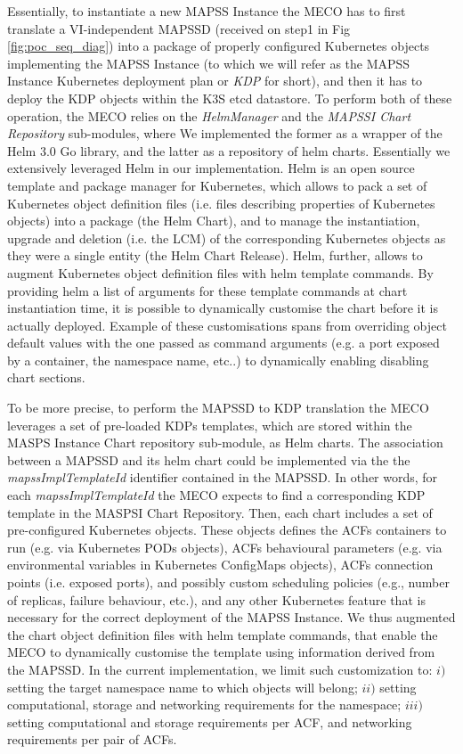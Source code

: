 Essentially, to instantiate a new MAPSS Instance the MECO has to first translate a VI-independent MAPSSD (received on step1 in Fig \ref{fig:poc_seq_diag}) into a package of properly configured Kubernetes objects implementing the MAPSS Instance (to which we will refer as the MAPSS Instance Kubernetes deployment plan or \textit{KDP} for short), and then it has to deploy the KDP objects within the K3S etcd datastore. To perform both of these operation, the MECO relies on the \textit{HelmManager} and the \textit{MAPSSI Chart Repository} sub-modules, where We implemented the former as a wrapper of the Helm 3.0 Go library, and the latter as a repository of helm charts. Essentially we extensively leveraged Helm in our implementation. Helm is an open source template and package manager for Kubernetes, which allows to pack a set of Kubernetes object definition files (i.e. files describing properties of Kubernetes objects) into a package (the Helm Chart), and to manage the instantiation, upgrade and deletion (i.e. the LCM) of the corresponding Kubernetes objects as they were a single entity (the Helm Chart Release). Helm, further, allows to augment Kubernetes object definition files with helm template commands. By providing helm a list of arguments for these template commands at chart instantiation time, it is possible to dynamically customise the chart before it is actually deployed.  Example of these customisations spans from overriding object default values with the one passed as command arguments (e.g. a port exposed by a container, the namespace name, etc..) to dynamically enabling disabling chart sections.

To be more precise, to perform the MAPSSD to KDP translation the MECO leverages a set of pre-loaded KDPs templates, which are stored within the MASPS Instance Chart repository sub-module, as Helm charts. The association between a MAPSSD and its helm chart could be implemented via the the \textit{mapssImplTemplateId} identifier contained in the MAPSSD. In other words, for each \textit{mapssImplTemplateId} the MECO expects to find a corresponding KDP template in the MASPSI Chart Repository. Then, each chart includes a set of pre-configured Kubernetes objects. These objects defines the ACFs containers to run (e.g. via Kubernetes PODs objects), ACFs behavioural parameters (e.g. via environmental variables in Kubernetes ConfigMaps objects), ACFs connection points (i.e. exposed ports), and possibly custom scheduling policies (e.g., number of replicas, failure behaviour, etc.), and any other Kubernetes feature that is necessary for the correct deployment of the MAPSS Instance. We thus augmented the chart object definition files with helm template commands, that enable the MECO to dynamically customise the template using information derived from the MAPSSD. In the current implementation, we limit such customization to: $i)$ setting the target namespace name to which objects will belong; $ii)$ setting computational, storage and networking requirements for the namespace; $iii)$ setting computational and storage requirements per ACF, and networking requirements per pair of ACFs. 

